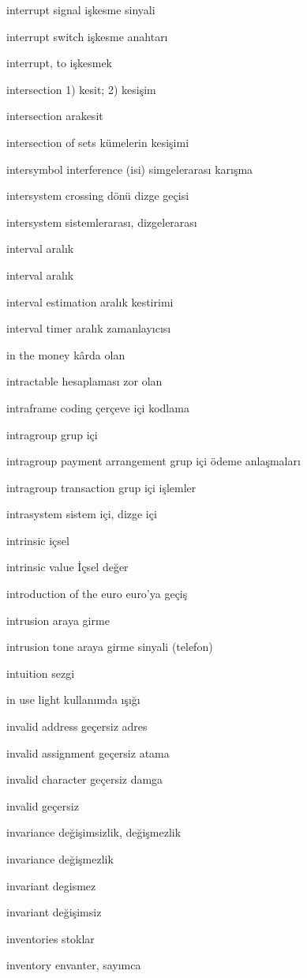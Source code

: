 \documentclass[12pt,fleqn]{article}\usepackage{../../common}
\begin{document}
interrupt signal işkesme sinyali

interrupt switch işkesme anahtarı

interrupt, to işkesmek

intersection 1) kesit; 2) kesişim

intersection arakesit

intersection of sets kümelerin kesişimi

intersymbol interference (isi) simgelerarası karışma

intersystem crossing dönü dizge geçisi

intersystem sistemlerarası, dizgelerarası

interval aralık

interval aralık

interval estimation aralık kestirimi

interval timer aralık zamanlayıcısı

in the money kârda olan

intractable hesaplaması zor olan

intraframe coding çerçeve içi kodlama

intragroup grup içi

intragroup payment arrangement grup içi ödeme anlaşmaları

intragroup transaction grup içi işlemler

intrasystem sistem içi, dizge içi

intrinsic içsel 

intrinsic value İçsel değer

introduction of the euro euro'ya geçiş

intrusion araya girme

intrusion tone araya girme sinyali (telefon)

intuition sezgi

in use light kullanımda ışığı

invalid address geçersiz adres

invalid assignment geçersiz atama

invalid character geçersiz damga

invalid geçersiz

invariance değişimsizlik, değişmezlik

invariance değişmezlik

invariant degismez

invariant değişimsiz

inventories stoklar

inventory envanter, sayımca
\end{document}
